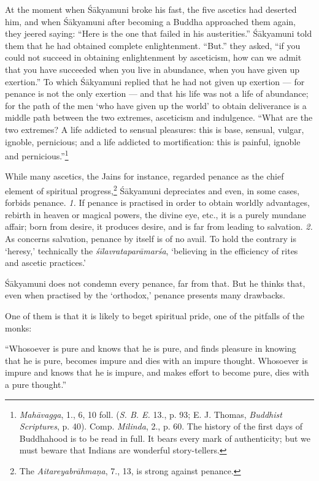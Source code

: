 \documentclass[a4paper, 11pt, oneside, english]{article}
\begin{document}
At the moment when Śākyamuni broke his fast, the five ascetics had deserted him, and when Śākyamuni after becoming a Buddha approached them again, they jeered saying: ``Here is the one that failed in his austerities.'' Śākyamuni told them that he had obtained complete enlightenment. ``But.'' they asked, ``if you could not succeed in obtaining enlightenment by asceticism, how can we admit that you have succeeded when you live in abundance, when you have given up exertion.'' To which Śākyamuni replied that he had not given up exertion --- for penance is not the only exertion --- and that his life was not a life of abundance; for the path of the men `who have given up the world' to obtain deliverance is a middle path between the two extremes, asceticism and indulgence. ``What are the two extremes? A life addicted to sensual pleasures: this is base, sensual, vulgar, ignoble, pernicious; and a life addicted to mortification: this is painful, ignoble and pernicious.''\footnote{\emph{Mahāvagga}, 1., 6, 10 foll. (\emph{S. B. E.} 13., p. 93; E. J. Thomas, \emph{Buddhist Scriptures}, p. 40). Comp. \emph{Milinda}, 2., p. 60. The history of the first days of Buddhahood is to be read in full. It bears every mark of authenticity; but we must beware that Indians are wonderful story-tellers.}

While many ascetics, the Jains for instance, regarded penance as the chief element of spiritual progress,\footnote{The \emph{Aitareyabrāhmaṇa}, 7., 13, is strong against penance.} Śākyamuni depreciates and even, in some cases, forbids penance. \emph{1.} If penance is practised in order to obtain worldly advantages, rebirth in heaven or magical powers, the divine eye, etc., it is a purely mundane affair; born from desire, it produces desire, and is far from leading to salvation. \emph{2.} As concerns salvation, penance by itself is of no avail. To hold the contrary is `heresy,' technically the \emph{śīlavrataparāmarśa}, `believing in the efficiency of rites and ascetic practices.'

Śākyamuni does not condemn every penance, far from that. But he thinks that, even when practised by the `orthodox,' penance presents many drawbacks.

One of them is that it is likely to beget spiritual pride, one of the pitfalls of the monks:

``Whosoever is pure and knows that he is pure, and finds pleasure in knowing that he is pure, becomes impure and dies with an impure thought. Whosoever is impure and knows that he is impure, and makes effort to become pure, dies with a pure thought.''
\end{document}
